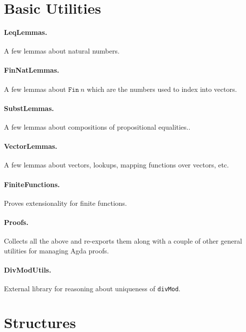 \documentclass{article}
\begin{document}
\section{Basic Utilities}

\paragraph*{LeqLemmas.} A few lemmas about natural numbers. 

\paragraph*{FinNatLemmas.} A few lemmas about $\texttt{Fin}~n$ which are the numbers used to index into vectors.

\paragraph*{SubstLemmas.} A few lemmas about compositions of propositional equalities..

\paragraph*{VectorLemmas.} A few lemmas about vectors, lookups, mapping functions over vectors, etc.

\paragraph*{FiniteFunctions.} Proves extensionality for finite functions. 

\paragraph*{Proofs.} Collects all the above and re-exports them along with a couple of other general utilities for managing Agda proofs. 

\paragraph*{DivModUtils.} External library for reasoning about uniqueness of \texttt{divMod}.

\section{Structures}
\end{document}
